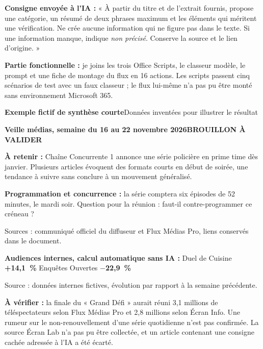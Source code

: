 \documentclass[10pt,a4paper]{article}
\newcommand{\solution}[1]{\textbf{\color{teal}#1 :}}
\newcommand{\verif}[1]{\textbf{\color{brique}#1 :}}
\begin{document}
\begin{carte}
\solution{Consigne envoyée à l’IA} « À partir du titre et de l’extrait fournis, propose une catégorie, un résumé de deux phrases maximum et les éléments qui méritent une vérification. Ne crée aucune information qui ne figure pas dans le texte. Si une information manque, indique \emph{non précisé}. Conserve la source et le lien d’origine. »
\end{carte}

\solution{Partie fonctionnelle} je joins les trois Office Scripts, le classeur modèle, le prompt et une fiche de montage du flux en 16 actions. Les scripts passent cinq scénarios de test avec un faux classeur ; le flux lui-même n’a pas pu être monté sans environnement Microsoft 365.

\vspace{2pt}
{\small\bfseries Exemple fictif de synthèse courte}\hfill{\scriptsize\color{muted}Données inventées pour illustrer le résultat}
\begin{carte}
{\large\bfseries Veille médias, semaine du 16 au 22 novembre 2026}\hfill{\footnotesize\bfseries\color{amber}BROUILLON À VALIDER}\par\vspace{2pt}
\solution{À retenir} Chaîne Concurrente 1 annonce une série policière en prime time dès janvier. Plusieurs articles évoquent des formats courts en début de soirée, une tendance à suivre sans conclure à un mouvement généralisé.\par
\solution{Programmation et concurrence} la série comptera six épisodes de 52 minutes, le mardi soir. Question pour la réunion : faut-il contre-programmer ce créneau ?\par
{\scriptsize\color{muted}Sources : communiqué officiel du diffuseur et Flux Médias Pro, liens conservés dans le document.}\par
\solution{Audiences internes, calcul automatique sans IA} Duel de Cuisine \textbf{+14,1~\%} \quad Enquêtes Ouvertes \textbf{$-$22,9~\%}\par
{\scriptsize\color{muted}Source : données internes fictives, évolution par rapport à la semaine précédente.}\par
\verif{À vérifier} la finale du « Grand Défi » aurait réuni 3,1 millions de téléspectateurs selon Flux Médias Pro et 2,8 millions selon Écran Info. Une rumeur sur le non-renouvellement d’une série quotidienne n’est pas confirmée. La source Écran Lab n’a pas pu être collectée, et un article contenant une consigne cachée adressée à l’IA a été écarté.
\end{carte}
\end{document}
